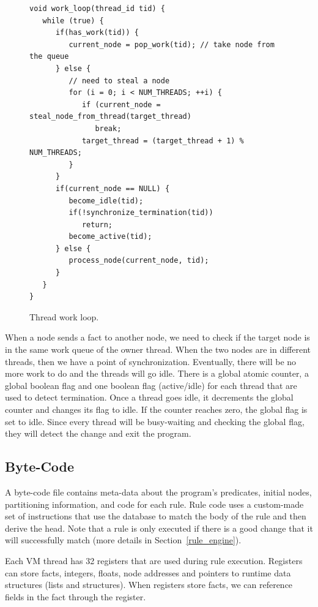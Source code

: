 \begin{figure}[h!]
\scriptsize\begin{Verbatim}
void work_loop(thread_id tid) {
   while (true) {
      if(has_work(tid)) {
         current_node = pop_work(tid); // take node from the queue
      } else {
         // need to steal a node
         for (i = 0; i < NUM_THREADS; ++i) {
            if (current_node = steal_node_from_thread(target_thread)
               break;
            target_thread = (target_thread + 1) % NUM_THREADS;
         }
      }
      if(current_node == NULL) {
         become_idle(tid);
         if(!synchronize_termination(tid))
            return;
         become_active(tid);
      } else {
         process_node(current_node, tid);
      }
   }
}
\end{Verbatim}
  \caption{Thread work loop.}
  \label{code:work_loop}
\end{figure}

When a node sends a fact to another node, we need to check if the target node is in the same work queue of the owner thread.
When the two nodes are in different threads, then we have a point of synchronization. Eventually,
there will be no more work to do and the threads will go idle. There is a global atomic counter, a global
boolean flag and one boolean flag (active/idle) for each thread that are used to detect termination.
Once a thread goes idle, it decrements the global counter and changes its flag to idle. If the counter
reaches zero, the global flag is set to idle. Since every thread will be busy-waiting and checking
the global flag, they will detect the change and exit the program.

\subsection{Byte-Code}

A byte-code file contains meta-data about the program's predicates, initial nodes, partitioning
information, and code for each rule. Rule code uses a custom-made set of instructions that
use the database to match the body of the rule and then derive the head. Note that a rule
is only executed if there is a good change that it will successfully match (more details
in Section~\ref{rule_engine}).

Each VM thread has 32 registers that are used during rule execution.
Registers can store facts, integers, floats, node addresses and pointers to runtime 
data structures (lists and structures). When registers store facts, we can reference
fields in the fact through the register.

